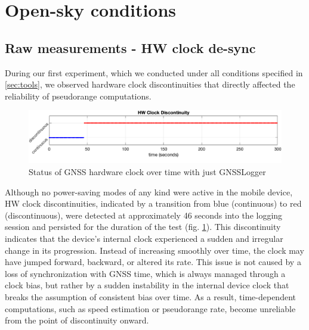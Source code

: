 \section{Open-sky conditions}
\label{sec:opensky}
\subsection{Raw measurements - HW clock de-sync}


During our first experiment, which we conducted under all conditions specified in \ref{sec:tools}, we observed hardware clock discontinuities that directly affected the reliability of pseudorange computations.


\begin{figure}[H]
        \centering
        \includegraphics[width=0.85\linewidth]{images/discontinuity_gnss_log.png}
        \caption{Status of GNSS hardware clock over time with just GNSSLogger}
        \label{fig:GNSSLogger-discontinuity}
\end{figure}

Although no power-saving modes of any kind were active in the mobile device, HW clock discontinuities, indicated by a transition from blue (continuous) to red (discontinuous), were detected at approximately 46 seconds into the logging session and persisted for the duration of the test (fig. \ref{fig:GNSSLogger-discontinuity}).
This discontinuity indicates that the device’s internal clock experienced a sudden and irregular change in its progression. Instead of increasing smoothly over time, the clock may have jumped forward, backward, or altered its rate. This issue is not caused by a loss of synchronization with GNSS time, which is always managed through a clock bias, but rather by a sudden instability in the internal device clock that breaks the assumption of consistent bias over time. As a result, time-dependent computations, such as speed estimation or pseudorange rate, become unreliable from the point of discontinuity onward.


